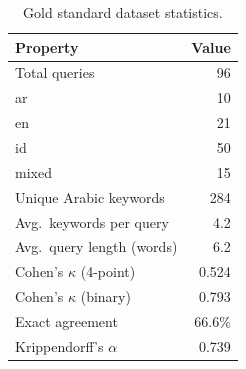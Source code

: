 \begin{table}[t]
\centering
\caption{Gold standard dataset statistics.}
\label{tab:gold-standard}
\begin{tabular}{lr}
\toprule
Property & Value \\
\midrule
Total queries & 96 \\
\quad ar & 10 \\
\quad en & 21 \\
\quad id & 50 \\
\quad mixed & 15 \\
Unique Arabic keywords & 284 \\
Avg.\ keywords per query & 4.2 \\
Avg.\ query length (words) & 6.2 \\
\midrule
Cohen's $\kappa$ (4-point) & 0.524 \\
Cohen's $\kappa$ (binary) & 0.793 \\
Exact agreement & 66.6\% \\
Krippendorff's $\alpha$ & 0.739 \\
\bottomrule
\end{tabular}
\end{table}
